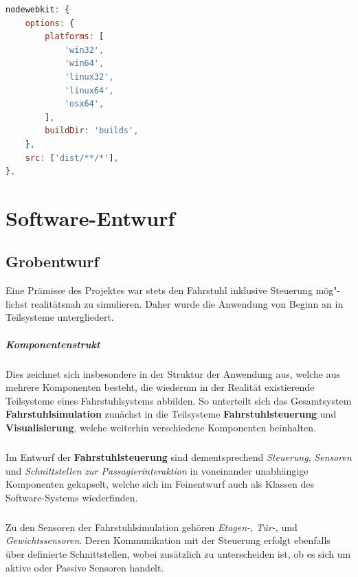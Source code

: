 \begin{lstlisting}[language=JavaScript,label=JS:grunt_webkit_config,caption=grunt nodewebkit-Konfiguration]
nodewebkit: {
	options: {
		platforms: [
			'win32',
			'win64',
			'linux32',
			'linux64',
			'osx64',
		],
		buildDir: 'builds',
	},
	src: ['dist/**/*'],
},
\end{lstlisting}

\chapter{Software-Entwurf}
\section{Grobentwurf}
Eine Prämisse des Projektes war stets den Fahrstuhl inklusive Steuerung mög"-lichst realitätsnah zu simulieren. Daher wurde die Anwendung von Beginn an in Teilsysteme untergliedert.

\paragraph{Komponentenstrukt}Dies zeichnet sich insbesondere in der Struktur der Anwendung aus, welche aus mehrere Komponenten besteht, die wiederum in der Realität existierende Teilsysteme eines Fahrstuhlsystems abbilden. So unterteilt sich das Gesamtsystem \textbf{Fahrstuhlsimulation} zunächst in die Teilsysteme \textbf{Fahrstuhlsteuerung} und \textbf{Visualisierung}, welche weiterhin verschiedene Komponenten beinhalten.

\paragraph{}Im Entwurf der \textbf{Fahrstuhlsteuerung} sind dementsprechend \textit{Steuerung}, \textit{Sensoren} und \textit{Schnittstellen zur Passagierinteraktion} in voneinander unabhängige Komponenten gekapselt, welche sich im Feinentwurf auch als Klassen des Software-Systems wiederfinden.

\paragraph{}Zu den Sensoren der Fahrstuhlsimulation gehören \textit{Etagen-}, \textit{Tür-}, und \textit{Gewichtssensoren}. Deren Kommunikation mit der Steuerung erfolgt ebenfalls über definierte Schnittstellen, wobei zusätzlich zu unterscheiden ist, ob es sich um aktive oder Passive Sensoren handelt.

